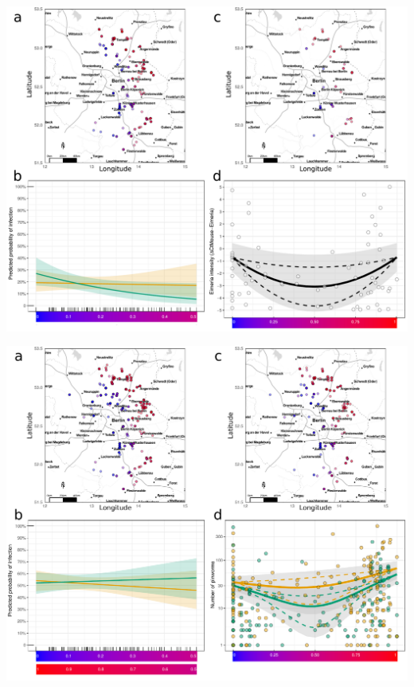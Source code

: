 \documentclass[24pt, a0paper, portrait, margin=0mm, innermargin=10mm,
               blockverticalspace=15mm, blocktitlewidthratio=0.5, colspace=10mm, 
               subcolspace=8mm]{tikzposter}
\begin{document}
      {
      \begin{multicols*}{2}
      
      \begin{tikzfigure}[Eimeria]
        \includegraphics[scale=0.9]{Figure2.pdf}
      \end{tikzfigure}

      \begin{tikzfigure}[Pinworms]
        \includegraphics[scale=0.9]{Figure3.pdf}
      \end{tikzfigure}


\end{multicols*}}
\end{document}
